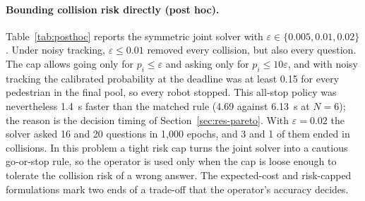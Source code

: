 \documentclass[a4paper,fleqn]{cas-dc}
\begin{document}
\paragraph{Bounding collision risk directly (post hoc).} Table~\ref{tab:posthoc} reports the symmetric joint solver with $\varepsilon \in \{0.005, 0.01, 0.02\}$. Under noisy tracking, $\varepsilon \le 0.01$ removed every collision, but also every question. The cap allows going only for $p_i \le \varepsilon$ and asking only for $p_i \le 10\varepsilon$, and with noisy tracking the calibrated probability at the deadline was at least 0.15 for every pedestrian in the final pool, so every robot stopped. This all-stop policy was nevertheless \SI{1.4}{s} faster than the matched rule (4.69 against \SI{6.13}{s} at $N = 6$); the reason is the decision timing of Section~\ref{sec:res-pareto}. With $\varepsilon = 0.02$ the solver asked 16 and 20 questions in 1{,}000 epochs, and 3 and 1 of them ended in collisions. In this problem a tight risk cap turns the joint solver into a cautious go-or-stop rule, so the operator is used only when the cap is loose enough to tolerate the collision risk of a wrong answer. The expected-cost and risk-capped formulations mark two ends of a trade-off that the operator's accuracy decides.
\end{document}
